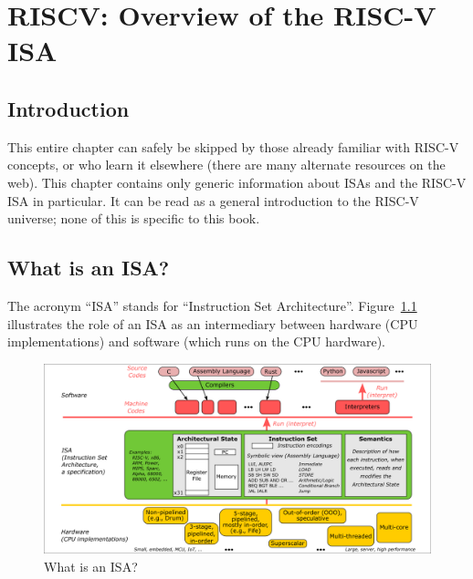 

\chapter{RISCV: Overview of the RISC-V ISA}



\setcounter{page}{1}
\renewcommand{\thepage}{\arabic{chapter}-\arabic{page}}

\label{ch_ISA}


\section{Introduction}

This entire chapter can safely be skipped by those already familiar
with RISC-V concepts, or who learn it elsewhere (there are many
alternate resources on the web).  This chapter contains only generic
information about ISAs and the RISC-V ISA in particular.  It can be
read as a general introduction to the RISC-V universe; none of this is
specific to this book.


\section{What is an ISA?}


The acronym ``ISA'' stands for ``Instruction Set Architecture''.
Figure~\ref{Fig_What_is_an_ISA} illustrates the role of an ISA as an
intermediary between hardware (CPU implementations) and software
(which runs on the CPU hardware).
\begin{figure}[htbp]
  \centerline{\includegraphics[width=6in,angle=0]{Figures/Fig_What_is_an_ISA}}
  \caption{\label{Fig_What_is_an_ISA} What is an ISA?}
\end{figure}

